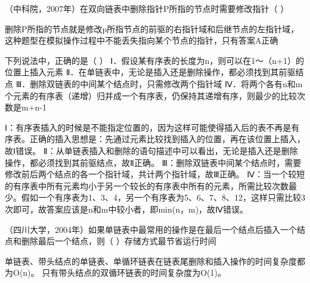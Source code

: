 \question （中科院，2007年）在双向链表中删除指针P所指的节点时需要修改指针（ ）
\par{}
\begin{solution}删除P所指的节点就是修改p所指节点的前驱的右指针域和后继节点的左指针域，这种题型在模拟操作过程中不能丢失指向某个节点的指针，只有答案A正确
\end{solution}
\question 下列说法中，正确的是（ ）
Ⅰ．假设某有序表的长度为n，则可以在1～（n+1）的位置上插入元素
Ⅱ．在单链表中，无论是插入还是删除操作，都必须找到其前驱结点
Ⅲ．删除双链表的中间某个结点时，只需修改两个指针域
Ⅳ．将两个各有n和m个元素的有序表（递增）归并成一个有序表，仍保持其递增有序，则最少的比较次数是m+n-1
\par{}
\begin{solution}Ⅰ：有序表插入的时候是不能指定位置的，因为这样可能使得插入后的表不再是有序表。正确的插入思想是：先通过元素比较找到插入的位置，再在该位置上插入，故Ⅰ错误。
Ⅱ：从单链表插入和删除的语句描述中可以看出，无论是插入还是删除操作，都必须找到其前驱结点，故Ⅱ正确。
Ⅲ：删除双链表中间某个结点时，需要修改前后两个结点的各一个指针域，共计两个指针域，故Ⅲ正确。
Ⅳ：当一个较短的有序表中所有元素均小于另一个较长的有序表中所有的元素，所需比较次数最少。假如一个有序表为1、3、4，另一个有序表为5、6、7、8、12，这样只需比较3次即可，故答案应该是n和m中较小者，即min(n，m)，故Ⅳ错误。
\end{solution}
\question （四川大学，2004年）如果单链表中最常用的操作是在最后一个结点后插入一个结点和删除最后一个结点，则（
）存储方式最节省运行时间
\par{}
\begin{solution}单链表、带头结点的单链表、单循环链表在链表尾删除和插入操作的时间复杂度都为O(n)。
只有带头结点的双循环链表的时间复杂度为O(1)。
\end{solution}
